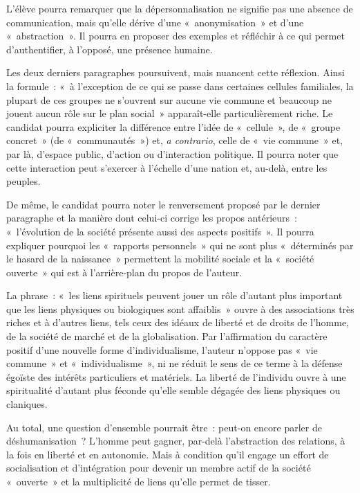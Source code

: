{L'élève pourra remarquer que la dépersonnalisation ne signifie pas une absence de
communication, mais qu'elle dérive d'une «~anonymisation~» et d'une «~abstraction~». Il pourra
en proposer des exemples et réfléchir à ce qui permet d'authentifier, à l'opposé, une présence
humaine.

Les deux derniers paragraphes poursuivent, mais nuancent cette réflexion. Ainsi la formule~:
«~à l'exception de ce qui se passe dans certaines cellules familiales, la plupart de ces groupes
ne s'ouvrent sur aucune vie commune et beaucoup ne jouent aucun rôle sur le plan social~»
apparaît-elle particulièrement riche. Le candidat pourra expliciter la différence entre l'idée de
«~cellule~», de «~groupe concret~» (de «~communautés~») et, \textit{a contrario}, celle de «~vie
commune~» et, par là, d'espace public, d'action ou d'interaction politique. Il pourra noter que
cette interaction peut s'exercer à l'échelle d'une nation et, au-delà, entre les peuples.

De même, le candidat pourra noter le renversement proposé par le dernier paragraphe et la
manière dont celui-ci corrige les propos antérieurs~: «~l'évolution de la société présente aussi
des aspects positifs~». Il pourra expliquer pourquoi les «~rapports personnels~» qui ne sont plus
«~déterminés par le hasard de la naissance~» permettent la mobilité sociale et la «~société
ouverte~» qui est à l'arrière-plan du propos de l'auteur.

La phrase~: «~les liens spirituels peuvent jouer un rôle d'autant plus important que les liens
physiques ou biologiques sont affaiblis~» ouvre à des associations très riches et à d'autres
liens, tels ceux des idéaux de liberté et de droits de l'homme, de la société de marché et de la
globalisation. Par l'affirmation du caractère positif d'une nouvelle forme d'individualisme,
l'auteur n'oppose pas «~vie commune~» et «~individualisme~», ni ne réduit le sens de ce terme
à la défense égoïste des intérêts particuliers et matériels. La liberté de l'individu ouvre à une
spiritualité d'autant plus féconde qu'elle semble dégagée des liens physiques ou claniques.

Au total, une question d'ensemble pourrait être~: peut-on encore parler de déshumanisation~?
L'homme peut gagner, par-delà l'abstraction des relations, à la fois en liberté et en autonomie.
Mais à condition qu'il engage un effort de socialisation et d'intégration pour devenir un membre
actif de la société «~ouverte~» et la multiplicité de liens qu'elle permet de tisser.}%
